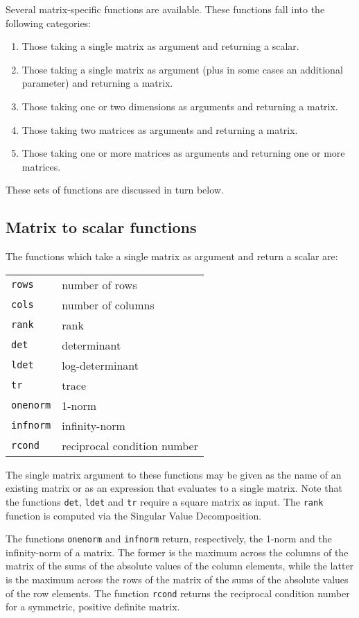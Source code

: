 Several matrix-specific functions are available.  These functions fall
into the following categories:
%
\begin{enumerate}
\item Those taking a single matrix as argument and returning a scalar.
\item Those taking a single matrix as argument (plus in some cases an
  additional parameter) and returning a matrix.
\item Those taking one or two dimensions as arguments and
  returning a matrix.
\item Those taking two matrices as arguments and returning a matrix.
\item Those taking one or more matrices as arguments and returning one
  or more matrices.
\end{enumerate}
%
These sets of functions are discussed in turn below.

\subsection{Matrix to scalar functions}
\label{matrix-to-scalar}

The functions which take a single matrix as argument and return a
scalar are:

\begin{center}
\begin{tabular}{ll}
\texttt{rows} & number of rows \\
\texttt{cols} & number of columns \\
\texttt{rank} & rank \\
\texttt{det} & determinant \\
\texttt{ldet} & log-determinant \\
\texttt{tr} & trace \\
\texttt{onenorm} & 1-norm \\
\texttt{infnorm} & infinity-norm \\
\texttt{rcond} & reciprocal condition number
\end{tabular}
\end{center}

The single matrix argument to these functions may be given as the name
of an existing matrix or as an expression that evaluates to a single
matrix.  Note that the functions \texttt{det}, \texttt{ldet} and
\texttt{tr} require a square matrix as input.  The \texttt{rank}
function is computed via the Singular Value Decomposition.

The functions \texttt{onenorm} and \texttt{infnorm} return,
respectively, the 1-norm and the infinity-norm of a matrix.  The
former is the maximum across the columns of the matrix of the sums of
the absolute values of the column elements, while the latter is the
maximum across the rows of the matrix of the sums of the absolute
values of the row elements.  The function \texttt{rcond} returns the
reciprocal condition number for a symmetric, positive definite matrix.

